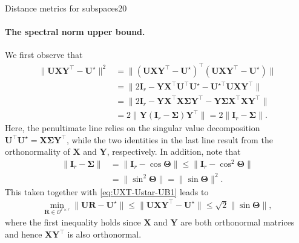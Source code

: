 \documentclass{article}
\begin{document}
\begin{problem}{Distance metrics for subspaces}{20}
{\paragraph{The spectral norm upper bound.}
We first observe that
%
\begin{align}
\|\bm{U}\bm{X}\bm{Y}^{\top}-\bm{U}^{\star}\|^{2} & =\|(\bm{U}\bm{X}\bm{Y}^{\top}-\bm{U}^{\star})^{\top}(\bm{U}\bm{X}\bm{Y}^{\top}-\bm{U}^{\star})\|\nonumber\\
 & =\|2\bm{I}_{r}-\bm{Y}\bm{X}^{\top}\bm{U}^{\top}\bm{U}^{\star}-\bm{U}^{\star\top}\bm{U}\bm{X}\bm{Y}^{\top}\| \nonumber\\
	& =\|2\bm{I}_{r}-\bm{Y}\bm{X}^{\top}\bm{X}\bm{\Sigma}\bm{Y}^{\top}-\bm{Y}\bm{\Sigma}\bm{X}^{\top}\bm{X}\bm{Y}^{\top}\| \nonumber\\
 & =2\|\bm{Y}(\bm{I}_{r}-\bm{\Sigma})\bm{Y}^{\top}\|=2\|\bm{I}_{r}-\bm{\Sigma}\|.
	\label{eq:UXT-Ustar-UB1}
\end{align}
%
Here, the penultimate line relies on the singular value decomposition $\bm{U}^{\top}\bm{U}^{\star}=\bm{X}\bm{\Sigma}\bm{Y}^{\top}$,
while the two identities in the last line result from  the orthonormality of $\bm{X}$ and $\bm{Y}$, respectively. In addition, note that
%
\begin{align*}
	\|\bm{I}_{r}-\bm{\Sigma}\| &= \|\bm{I}_{r}-\cos\bm{\Theta}\|\leq\|\bm{I}_{r}-\cos^{2}\bm{\Theta}\| \\
	& =\|\sin^{2}\bm{\Theta}\|=\|\sin\bm{\Theta}\|^2.
\end{align*}
%
This taken together with \eqref{eq:UXT-Ustar-UB1} leads to
%
\begin{align*}
	\min_{\bm{R}\in \mathcal{O}^{r\times r}}\big\|\bm{U}\bm{R}-\bm{U}^{\star}\big\|
	\leq \big\|\bm{U}\bm{X}\bm{Y}^{\top}-\bm{U}^{\star}\big\| \leq \sqrt{2} \|\sin \bm{\Theta} \| ,
\end{align*}
%
where the first inequality holds since $\bm{X}$ and $\bm{Y}$ are both orthonormal matrices and hence $\bm{X}\bm{Y}^{\top}$ is also orthonormal.



}
\end{problem}
\end{document}

